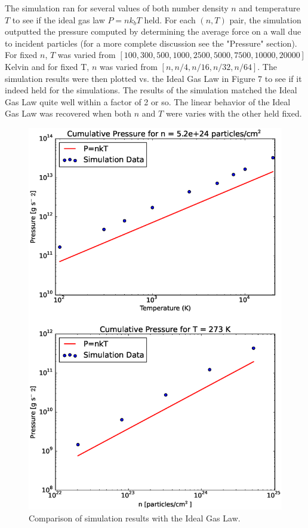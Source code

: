 \documentclass[12pt]{amsart}
\begin{document}
The simulation ran for several values of both number density $n$ and temperature $T$ to see if the ideal gas law $P=nk_bT$ held.  For each $(n,T)$ pair, the simulation outputted the pressure computed by determining the average force on a wall due to incident particles (for a more complete discussion see the "Pressure" section).  For fixed $n$, $T$ was varied from $[100,300,500,1000,2500,5000,7500,10000,20000]$ Kelvin and for fixed T, $n$ was varied from $[n,n/4,n/16,n/32,n/64]$. The simulation results were then plotted vs. the Ideal Gas Law in Figure 7 to see if it indeed held for the simulations. The results of the simulation matched the Ideal Gas Law quite well within a factor of 2 or so. The linear behavior of the Ideal Gas Law was recovered when both $n$ and $T$ were varies with the other held fixed. 

\begin{figure}[h!]
  \centering
    \includegraphics[width=1.0\textwidth]{pv_nrt.eps}
    \caption{Comparison of simulation results with the Ideal Gas Law.}
\end{figure}
\end{document}

